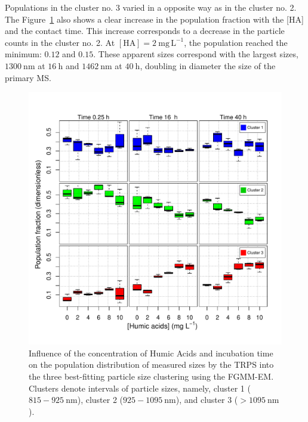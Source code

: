 \documentclass[journal=langd5,manuscript=article]{achemso}
\begin{document}
Populations in the cluster no. 3 varied in a opposite way as in the cluster no. 2. The Figure~\ref{fgr:boxplot_populations} also shows a clear increase in the population fraction with the [HA] and the contact time. This increase corresponds to a decrease in the particle counts in the cluster no. 2. At $\mathrm{[HA]} = 2~\mathrm{mg\,L^{-1}}$, the  population reached the  minimum: $0.12$  and $0.15$. These apparent sizes correspond with the largest sizes, $1300~\mathrm{nm}$ at $16~\mathrm{h}$ and $1462~\mathrm{nm}$ at $40~\mathrm{h}$, doubling in  diameter the size of the primary MS.



\begin{figure}
 \includegraphics[width=0.8\linewidth]{Figures/Boxplot_MS_HA_CaCl2_populations.pdf}
  \caption{Influence of the concentration of Humic Acids and incubation  time on the po\-pulation distribution of measured sizes by the TRPS into the three best-fitting particle size clustering using the FGMM-EM. Clusters denote intervals of particle sizes, namely,
  cluster 1 ($815 - 925~\mathrm{nm}$),   cluster 2 ($925 - 1095~\mathrm{nm}$), 
  and
  cluster 3 ($ > 1095~\mathrm{nm}$).
  }
  \label{fgr:boxplot_populations}
\end{figure}
\end{document}
